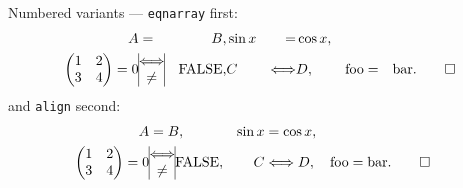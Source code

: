 \documentclass{article}
\begin{document}
Numbered variants --- \texttt{eqnarray} first:
\begin{eqnarray}
	A & = & B
,&
	\sin x & = & \cos x
,\\
		\begin{pmatrix} 1 & 2 \\ 3 & 4 \end{pmatrix} = 0
	&
		\begin{array}{|@{}c@{}|}\Longleftrightarrow \\ \neq \end{array}
	&
		\mathrm{FALSE}
,&
	C & \Longleftrightarrow & D
,&
	\text{foo} & = & \text{bar}
.\qedhere
\end{eqnarray}
and \texttt{align} second:
\begin{align}
	A & =  B
,&
	\sin x & =  \cos x
,\\
		\begin{pmatrix} 1 & 2 \\ 3 & 4 \end{pmatrix} = 0
	&
		\begin{array}{|@{}c@{}|}\Longleftrightarrow \\ \neq \end{array}
		\mathrm{FALSE}
,&
	C & \Longleftrightarrow D
,&
	\text{foo} & =  \text{bar}
.\qedhere
\end{align}
\end{document}

